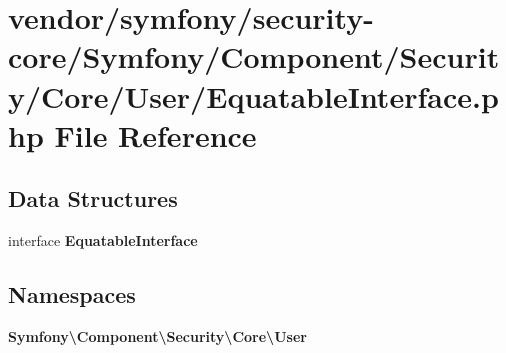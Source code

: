 \section{vendor/symfony/security-\/core/\+Symfony/\+Component/\+Security/\+Core/\+User/\+Equatable\+Interface.php File Reference}
\label{_equatable_interface_8php}
\subsection*{Data Structures}
\begin{DoxyCompactItemize}
\item 
interface {\bf Equatable\+Interface}
\end{DoxyCompactItemize}
\subsection*{Namespaces}
\begin{DoxyCompactItemize}
\item 
 {\bf Symfony\textbackslash{}\+Component\textbackslash{}\+Security\textbackslash{}\+Core\textbackslash{}\+User}
\end{DoxyCompactItemize}
